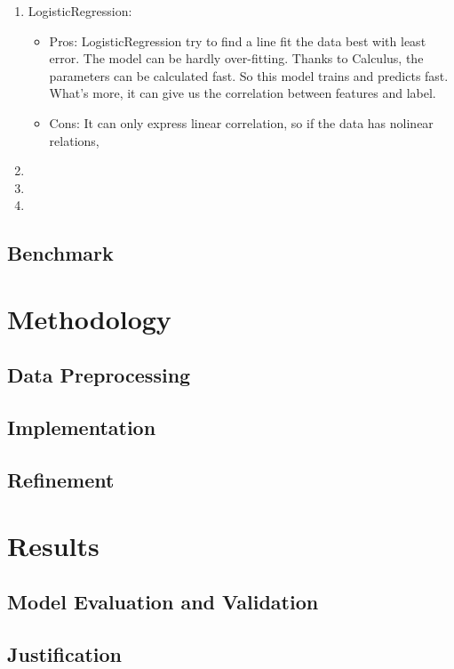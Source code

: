 \documentclass[12pt,a4paper]{article}
\theoremstyle{definition}
\begin{document}
\begin{enumerate}
    \item LogisticRegression:
        \begin{itemize}
            \item Pros: LogisticRegression try to find a line fit the data best with least error. The model can be hardly over-fitting. Thanks to Calculus, the parameters can be calculated fast. So this model trains and predicts fast. What's more, it can give us the correlation between features and label.
            \item Cons: It can only express linear correlation, so if the data has nolinear relations,
        \end{itemize}
    \item
    \item
    \item
\end{enumerate}

\subsection{Benchmark}

\section{Methodology}
\subsection{Data Preprocessing}
\subsection{Implementation}
\subsection{Refinement}

\section{Results}
\subsection{Model Evaluation and Validation}
\subsection{Justification}
\end{document}
